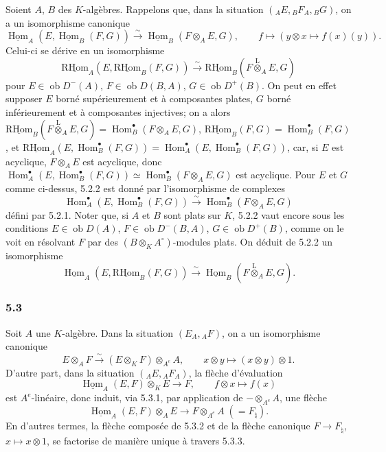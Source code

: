 \documentclass[11pt]{article}
\DeclareMathOperator{\Hom}{Hom}
\newcommand{\ob}{\operatorname{ob}}
\providecommand{\RHom}{\mathrm{RHom}}
\providecommand{\uRHom}{\underline{\RHom}}
\providecommand{\uHom}{\underline{\Hom}}
\providecommand{\lten}{\overset{\mathrm L}{\otimes}}
\providecommand{\RHom}{\mathrm{RHom}}
\providecommand{\Hom}{\operatorname{Hom}}
\providecommand{\ob}{\operatorname{ob}}
\providecommand{\lten}{\overset{\mathrm L}{\otimes}}
\providecommand{\RHom}{\mathrm R\mathcal{H}om}
\providecommand{\lten}{\overset{\mathrm L}{\otimes}}
\providecommand{\lten}{\overset{\mathrm L}{\otimes}}
\providecommand{\lten}{\overset{\mathrm L}{\otimes}}
\providecommand{\lten}{\overset{\mathrm L}{\otimes}}
\providecommand{\RHom}{\mathrm{RHom}}
\providecommand{\Hom}{\operatorname{Hom}}
\providecommand{\lten}{\overset{\mathrm L}{\otimes}}
\begin{document}
Soient $A$, $B$ des $K$-algèbres. Rappelons que, dans la situation $({}_AE,{}_BF_A,{}_BG)$, on a un isomorphisme canonique
\begin{equation}\tag{5.2.1}
\uHom_A(E,\uHom_B(F,G))\xrightarrow{\sim}\uHom_B(F\otimes_AE,G),\qquad
f\longmapsto (y\otimes x\longmapsto f(x)(y)).
\end{equation}
Celui-ci se dérive en un isomorphisme
\begin{equation}\tag{5.2.2}
\uRHom_A(E,\uRHom_B(F,G))\xrightarrow{\sim}\uRHom_B(F\lten_AE,G)
\end{equation}
pour $E\in\ob D^-(A)$, $F\in\ob D(B,A)$, $G\in\ob D^+(B)$. On peut en effet supposer $E$ borné supérieurement et à composantes plates, $G$ borné inférieurement et à composantes injectives; on a alors $\uRHom_B(F\lten_AE,G)=\Hom_B^\bullet(F\otimes_AE,G)$, $\uRHom_B(F,G)=\Hom_B^\bullet(F,G)$, et $\uRHom_A(E,\Hom_B^\bullet(F,G))=\Hom_A^\bullet(E,\Hom_B^\bullet(F,G))$, car, si $E$ est acyclique, $F\otimes_AE$ est acyclique, donc $\Hom_A^\bullet(E,\Hom_B^\bullet(F,G))\simeq\Hom_B^\bullet(F\otimes_AE,G)$ est acyclique. Pour $E$ et $G$ comme ci-dessus, 5.2.2 est donné par l'isomorphisme de complexes
\[
\Hom_A^\bullet(E,\Hom_B^\bullet(F,G))\xrightarrow{\sim}\Hom_B^\bullet(F\otimes_AE,G)
\]
défini par 5.2.1. Noter que, si $A$ et $B$ sont plats sur $K$, 5.2.2 vaut encore sous les conditions $E\in\ob D(A)$, $F\in\ob D^-(B,A)$, $G\in\ob D^+(B)$, comme on le voit en résolvant $F$ par des $(B\otimes_KA^\circ)$-modules plats. On déduit de 5.2.2 un isomorphisme
\begin{equation}\tag{5.2.3}
\uHom_A(E,\uRHom_B(F,G))\xrightarrow{\sim}\uHom_B(F\lten_AE,G).
\end{equation}

\subsubsection*{5.3}

Soit $A$ une $K$-algèbre. Dans la situation $(E_A,{}_AF)$, on a un isomorphisme canonique
\begin{equation}\tag{5.3.1}
E\otimes_AF\xrightarrow{\sim}(E\otimes_KF)\otimes_{A^e}A,
\qquad x\otimes y\longmapsto (x\otimes y)\otimes 1.
\end{equation}
D'autre part, dans la situation $({}_AE,{}_AF_A)$, la flèche d'évaluation
\begin{equation}\tag{5.3.2}
\uHom_A(E,F)\otimes_KE\longrightarrow F,
\qquad f\otimes x\longmapsto f(x)
\end{equation}
est $A^e$-linéaire, donc induit, via 5.3.1, par application de $-\otimes_{A^e}A$, une flèche
\begin{equation}\tag{5.3.3}
\uHom_A(E,F)\otimes_AE\longrightarrow F\otimes_{A^e}A\;(=F_\natural).
\end{equation}
En d'autres termes, la flèche composée de 5.3.2 et de la flèche canonique $F\to F_\natural$, $x\mapsto x\otimes 1$, se factorise de manière unique à travers 5.3.3.
\end{document}
